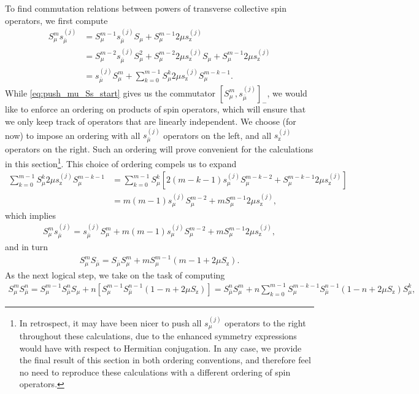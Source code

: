 \documentclass[pra,twocolumn,longbibliography]{revtex4-2}
\newcommand{\p}[1]{\left( #1 \right)} %
\renewcommand{\sp}[1]{\left[ #1 \right]} %
\newcommand{\z}{\text{z}}
\newcommand{\bmu}{{\bar\mu}}
\newcommand{\1}{\mathds{1}}
\begin{document}
To find commutation relations between powers of transverse collective
spin operators, we first compute
\begin{align}
  S_\mu^m s_\bmu^{(j)}
  &= S_\mu^{m-1}s_\bmu^{(j)} S_\mu
  + S_\mu^{m-1} 2\mu s_\z^{(j)} \\
  &= S_\mu^{m-2} s_\bmu^{(j)} S_\mu^2
  + S_\mu^{m-2} 2\mu s_\z^{(j)} S_\mu
  + S_\mu^{m-1} 2\mu s_\z^{(j)} \\
  &= s_\bmu^{(j)} S_\mu^m
  + \sum_{k=0}^{m-1} S_\mu^k 2\mu s_\z^{(j)} S_\mu^{m-k-1}
  \label{eq:push_mu_Ss_start}.
\end{align}
While \eqref{eq:push_mu_Ss_start} gives us the commutator
$\sp{S_\mu^m,s_\bmu^{(j)}}_-$, we would like to enforce an ordering on
products of spin operators, which will ensure that we only keep track
of operators that are linearly independent.  We choose (for now) to
impose an ordering with all $s_\bmu^{(j)}$ operators on the left, and
all $s_\z^{(j)}$ operators on the right.  Such an ordering will prove
convenient for the calculations in this section\footnote{In
  retrospect, it may have been nicer to push all $s_\mu^{(j)}$
  operators to the right throughout these calculations, due to the
  enhanced symmetry expressions would have with respect to Hermitian
  conjugation.  In any case, we provide the final result of this
  section in both ordering conventions, and therefore feel no need to
  reproduce these calculations with a different ordering of spin
  operators.}.  This choice of ordering compels us to expand
\begin{align}
  \sum_{k=0}^{m-1} S_\mu^k 2\mu s_\z^{(j)} S_\mu^{m-k-1}
  &= \sum_{k=0}^{m-1} S_\mu^k
  \sp{2\p{m-k-1} s_\mu^{(j)} S_\mu^{m-k-2}
    + S_\mu^{m-k-1} 2\mu s_\z^{(j)}} \\
  &= m \p{m-1} s_\mu^{(j)} S_\mu^{m-2}
  + m S_\mu^{m-1} 2\mu s_\z^{(j)},
\end{align}
which implies
\begin{align}
  S_\mu^m s_\bmu^{(j)}
  = s_\bmu^{(j)} S_\mu^m + m \p{m-1} s_\mu^{(j)} S_\mu^{m-2}
  + m S_\mu^{m-1} 2\mu s_\z^{(j)},
  \label{eq:push_mu_Ss}
\end{align}
and in turn
\begin{align}
  S_\mu^m S_\bmu = S_\bmu S_\mu^m
  + m S_\mu^{m-1} \p{m - 1 + 2\mu S_\z}.
  \label{eq:push_mu_single}
\end{align}
As the next logical step, we take on the task of computing
\begin{align}
  S_\mu^m S_\bmu^n
  = S_\mu^{m-1} S_\bmu^n S_\mu
  + n \sp{S_\mu^{m-1} S_\bmu^{n-1} \p{1 - n + 2\mu S_\z}}
  = S_\bmu^n S_\mu^m
  + n \sum_{k=0}^{m-1} S_\mu^{m-k-1} S_\bmu^{n-1}
  \p{1 - n + 2\mu S_\z} S_\mu^k,
\end{align}
\end{document}
